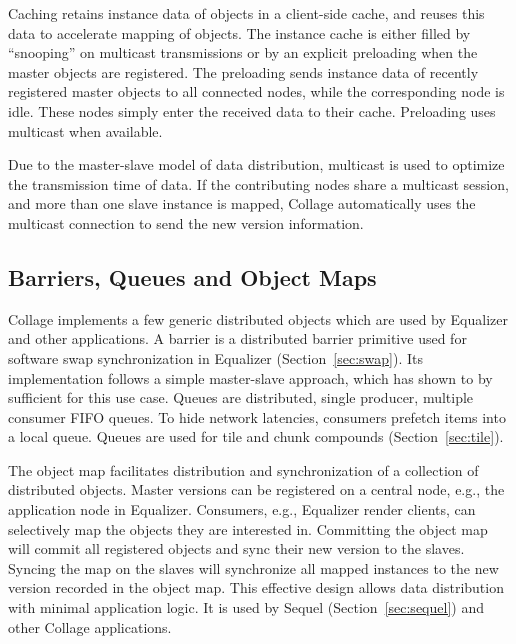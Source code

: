 \documentclass[10pt,journal,compsoc]{IEEEtran}
\newcommand{\sref}[1]{Section~\ref{#1}}
\begin{document}
Caching retains instance data of objects in a client-side cache, and reuses this
data to accelerate mapping of objects. The instance cache is either filled by
``snooping'' on multicast transmissions or by an explicit preloading when the
master objects are registered. The preloading sends instance data of recently
registered master objects to all connected nodes, while the corresponding node
is idle. These nodes simply enter the received data to their cache. Preloading
uses multicast when available.

Due to the master-slave model of data distribution, multicast is used to
optimize the transmission time of data. If the contributing nodes share a
multicast session, and more than one slave instance is mapped, \textsf{Collage}
automatically uses the multicast connection to send the new version information.

\subsection{Barriers, Queues and Object Maps}\label{sec:barrier}

\textsf{Collage} implements a few generic distributed objects which are used by
\textsf{Equalizer} and other applications. A barrier is a distributed barrier
primitive used for software swap synchronization in \textsf{Equalizer}
(\sref{sec:swap}). Its implementation follows a simple master-slave approach,
which has shown to by sufficient for this use case. Queues are distributed,
single producer, multiple consumer FIFO queues. To hide network latencies,
consumers prefetch items into a local queue. Queues are used for tile and chunk
compounds (\sref{sec:tile}).

The object map facilitates distribution and synchronization of a collection of
distributed objects. Master versions can be registered on a central node, e.g.,
the application node in \textsf{Equalizer}. Consumers, e.g., \textsf{Equalizer}
render clients, can selectively map the objects they are interested in.
Committing the object map will commit all registered objects and sync their new
version to the slaves. Syncing the map on the slaves will synchronize all mapped
instances to the new version recorded in the object map. This effective design
allows data distribution with minimal application logic. It is used by
\textsf{Sequel} (\sref{sec:sequel}) and other \textsf{Collage} applications.

\end{document}
